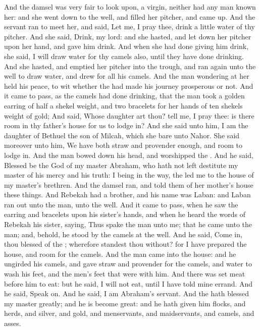 \begin{biblechapter}
\verse And the damsel was very fair to look upon, a virgin, neither had any man known her: and she went down to the well, and filled her pitcher, and came up.
\verse And the servant ran to meet her, and said, Let me, I pray thee, drink a little water of thy pitcher.
\verse And she said, Drink, my lord: and she hasted, and let down her pitcher upon her hand, and gave him drink.
\verse And when she had done giving him drink, she said, I will draw water for thy camels also, until they have done drinking.
\verse And she hasted, and emptied her pitcher into the trough, and ran again unto the well to draw water, and drew for all his camels.
\verse And the man wondering at her held his peace, to wit whether the \LORD had made his journey prosperous or not.
\verse And it came to pass, as the camels had done drinking, that the man took a golden earring of half a shekel weight, and two bracelets for her hands of ten shekels weight of gold;
\verse And said, Whose daughter art thou? tell me, I pray thee: is there room in thy father's house for us to lodge in?
\verse And she said unto him, I am the daughter of Bethuel the son of Milcah, which she bare unto Nahor.
\verse She said moreover unto him, We have both straw and provender enough, and room to lodge in.
\verse And the man bowed down his head, and worshipped the \LORD.
\verse And he said, Blessed be the \LORD God of my master Abraham, who hath not left destitute my master of his mercy and his truth: I being in the way, the \LORD led me to the house of my master's brethren.
\verse And the damsel ran, and told them of her mother's house these things.
\verse And Rebekah had a brother, and his name was Laban: and Laban ran out unto the man, unto the well.
\verse And it came to pass, when he saw the earring and bracelets upon his sister's hands, and when he heard the words of Rebekah his sister, saying, Thus spake the man unto me; that he came unto the man; and, behold, he stood by the camels at the well.
\verse And he said, Come in, thou blessed of the \LORD; wherefore standest thou without? for I have prepared the house, and room for the camels.
\verse And the man came into the house: and he ungirded his camels, and gave straw and provender for the camels, and water to wash his feet, and the men's feet that were with him.
\verse And there was set meat before him to eat: but he said, I will not eat, until I have told mine errand. And he said, Speak on.
\verse And he said, I am Abraham's servant.
\verse And the \LORD hath blessed my master greatly; and he is become great: and he hath given him flocks, and herds, and silver, and gold, and menservants, and maidservants, and camels, and asses.

\end{biblechapter}
